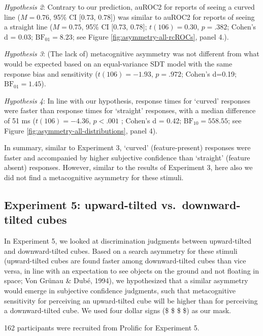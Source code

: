 \documentclass[12pt,twoside]{reedthesis}
\begin{document}
\emph{Hypothesis 2}: Contrary to our prediction, auROC2 for reports of seeing a curved line (\(M = 0.76\), 95\% CI \([0.73\), \(0.78]\)) was similar to auROC2 for reports of seeing a straight line (\(M = 0.75\), 95\% CI \([0.73\), \(0.78]\); \(t(106) = 0.30\), \(p = .382\); Cohen's d = 0.03; \(\mathrm{BF}_{\textrm{01}} = 8.23\); see Figure \ref{fig:asymmetry-all-rcROCs}, panel 4.).

\emph{Hypothesis 3}: (The lack of) metacognitive asymmetry was not different from what would be expected based on an equal-variance SDT model with the same response bias and sensitivity (\(t(106) = -1.93\), \(p = .972\); Cohen's d=0.19; \(\mathrm{BF}_{\textrm{01}} = 1.45\)).

\emph{Hypothesis 4}: In line with our hypothesis, response times for `curved' responses were faster than response times for `straight' responses, with a median difference of 51 ms (\(t(106) = -4.36\), \(p < .001\) ; Cohen's d = 0.42; \(\mathrm{BF}_{\textrm{10}} = 558.55\); see Figure \ref{fig:asymmetry-all-distributions}, panel 4).

In summary, similar to Experiment 3, `curved' (feature-present) responses were faster and accompanied by higher subjective confidence than `straight' (feature absent) responses. However, similar to the results of Experiment 3, here also we did not find a metacognitive asymmetry for these stimuli.

\hypertarget{experiment-5-upward-tilted-vs.-downward-tilted-cubes}{%
\subsection{Experiment 5: upward-tilted vs.~downward-tilted cubes}\label{experiment-5-upward-tilted-vs.-downward-tilted-cubes}}

In Experiment 5, we looked at discrimination judgments between upward-tilted and downward-tilted cubes. Based on a search asymmetry for these stimuli (upward-tilted cubes are found faster among downward-tilted cubes than vice versa, in line with an expectation to see objects on the ground and not floating in space; Von Grünau \& Dubé, 1994), we hypothesized that a similar asymmetry would emerge in subjective confidence judgments, such that metacognitive sensitivity for perceiving an upward-tilted cube will be higher than for perceiving a downward-tilted cube. We used four dollar signs (\$ \$ \$ \$) as our mask.

162 participants were recruited from Prolific for Experiment 5.
\end{document}
